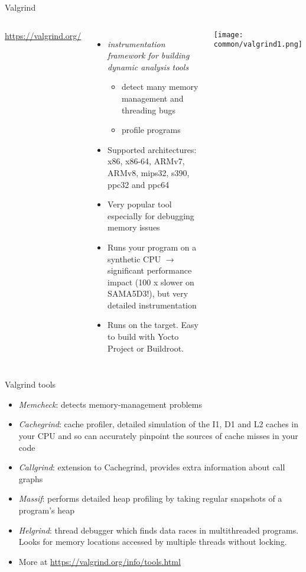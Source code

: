 \begin{frame}{Valgrind}
  \begin{columns}[T]
    \url{https://valgrind.org/}
    \begin{itemize}
    \item {\em instrumentation framework for building dynamic analysis tools}
      \begin{itemize}
      \item detect many memory management and threading bugs
      \item profile programs
      \end{itemize}
    \item Supported architectures: x86, x86-64, ARMv7, ARMv8, mips32,
      s390, ppc32 and ppc64
    \item Very popular tool especially for debugging memory issues
    \item Runs your program on a synthetic CPU $\rightarrow$
      significant performance impact (100 x slower on SAMA5D3!),
      but very detailed instrumentation
    \item Runs on the target. Easy to build with Yocto Project
          or Buildroot.
    \end{itemize}
    \texttt{[image: common/valgrind1.png]}
  \end{columns}
\end{frame}

\begin{frame}{Valgrind tools}
  \begin{itemize}
  \item {\em Memcheck}: detects memory-management problems
  \item {\em Cachegrind}: cache profiler, detailed simulation of the
    I1, D1 and L2 caches in your CPU and so can accurately pinpoint
    the sources of cache misses in your code
  \item {\em Callgrind}: extension to Cachegrind, provides extra
    information about call graphs
  \item {\em Massif}: performs detailed heap profiling by taking
    regular snapshots of a program's heap
  \item {\em Helgrind}: thread debugger which finds data races in
    multithreaded programs. Looks for memory locations accessed by
    multiple threads without locking.
  \item More at \url{https://valgrind.org/info/tools.html}
  \end{itemize}
\end{frame}

